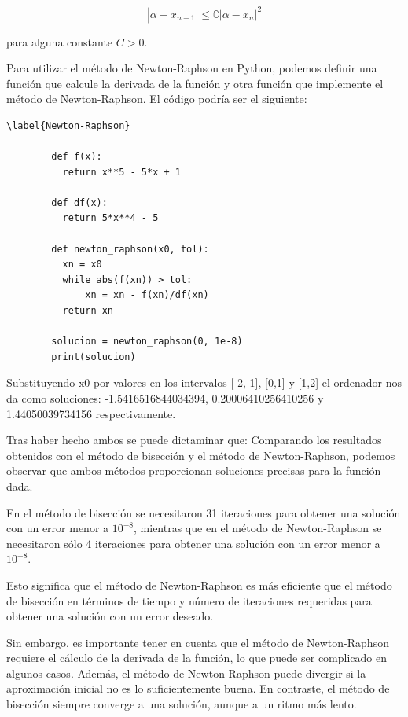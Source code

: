 \documentclass[12pt]{article}
\begin{document}
      \begin{equation}\label{Newton_b}
        
        |\alpha - x_{n+1}| \leq \complement |\alpha - x_{n}|^2

      \end{equation}

      para alguna constante $C > 0$.

      Para utilizar el método de Newton-Raphson en Python, podemos definir una función que calcule la derivada de la función y otra función que implemente el método de Newton-Raphson. El código podría ser el siguiente:

      \begin{lstlisting}\label{Newton-Raphson}

        def f(x):
          return x**5 - 5*x + 1

        def df(x):
          return 5*x**4 - 5

        def newton_raphson(x0, tol):
          xn = x0
          while abs(f(xn)) > tol:
              xn = xn - f(xn)/df(xn)
          return xn

        solucion = newton_raphson(0, 1e-8)
        print(solucion)

      \end{lstlisting}

      Substituyendo x0 por valores en los intervalos [-2,-1], [0,1] y [1,2] el ordenador nos da como soluciones:
      -1.5416516844034394, 0.20006410256410256 y 1.44050039734156 respectivamente.

      Tras haber hecho ambos se puede dictaminar que:
      Comparando los resultados obtenidos con el método de bisección y el método de Newton-Raphson, podemos observar que ambos métodos proporcionan soluciones precisas para la función dada.

      En el método de bisección se necesitaron 31 iteraciones para obtener una solución con un error menor a $10^{-8}$, mientras que en el método de Newton-Raphson se necesitaron sólo 4 iteraciones para obtener una solución con un error menor a $10^{-8}$.

      Esto significa que el método de Newton-Raphson es más eficiente que el método de bisección en términos de tiempo y número de iteraciones requeridas para obtener una solución con un error deseado.

      Sin embargo, es importante tener en cuenta que el método de Newton-Raphson requiere el cálculo de la derivada de la función, lo que puede ser complicado en algunos casos. Además, el método de Newton-Raphson puede divergir si la aproximación inicial no es lo suficientemente buena. En contraste, el método de bisección siempre converge a una solución, aunque a un ritmo más lento.
\end{document}
